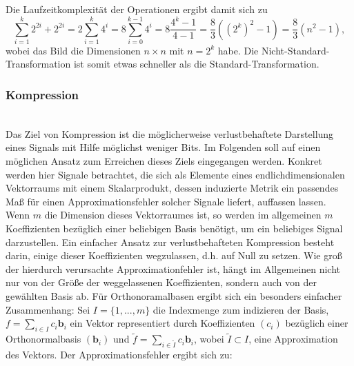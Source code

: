 \documentclass{article}
\begin{document}
%
Die Laufzeitkomplexität der Operationen ergibt damit sich zu 
%
\[
\sum_{i=1}^k 2^{2i} + 2^{2i} 
= 2\sum_{i=1}^k 4^i 
= 8\sum_{i=0}^{k-1} 4^i 
= 8\frac{4^k-1}{4-1} 
= \frac{8}{3}((2^k)^2-1) 
= \frac{8}{3}(n^2-1) ,
\]
%
wobei das Bild die Dimensionen $n \times n$ mit $n=2^k$ habe. Die Nicht-Standard-Transformation ist somit etwas schneller als die Standard-Transformation.
%
\subsubsection{Kompression}~\\
%
Das Ziel von Kompression ist die möglicherweise verlustbehaftete Darstellung eines Signals mit Hilfe möglichst weniger Bits. Im Folgenden soll auf einen möglichen Ansatz zum Erreichen dieses Ziels eingegangen werden.
Konkret werden hier Signale betrachtet, die sich als Elemente eines endlichdimensionalen Vektorraums mit einem Skalarprodukt, dessen induzierte Metrik ein passendes Maß für einen Approximationsfehler solcher Signale liefert, auffassen lassen. Wenn $m$ die Dimension dieses Vektorraumes ist, so werden im allgemeinen $m$ Koeffizienten bezüglich einer beliebigen Basis benötigt, um ein beliebiges Signal darzustellen. Ein einfacher Ansatz zur verlustbehafteten Kompression besteht darin, einige dieser Koeffizienten wegzulassen, d.h. auf Null zu setzen. Wie groß der hierdurch verursachte Approximationfehler ist, hängt im Allgemeinen nicht nur von der Größe der weggelassenen Koeffizienten, sondern auch von der gewählten Basis ab. Für Orthonoramalbasen ergibt sich ein besonders einfacher Zusammenhang: Sei $I=\{1,...,m\}$ die Indexmenge zum indizieren der Basis, $f=\sum_{i \in I} c_i \mathbf{b}_i$ ein Vektor representiert durch Koeffizienten $(c_i)$ bezüglich einer Orthonormalbasis $(\mathbf{b}_i)$ und $\tilde{f}=\sum_{i \in \tilde{I}} c_i \mathbf{b}_i$, wobei $\tilde{I} \subset I$, eine Approximation des Vektors. Der Approximationsfehler ergibt sich zu:
\end{document}
